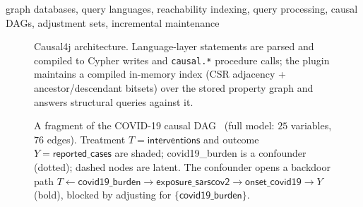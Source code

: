 \documentclass[conference]{IEEEtran}
\begin{document}
\begin{IEEEkeywords}
graph databases, query languages, reachability indexing, query processing,
causal DAGs, adjustment sets, incremental maintenance
\end{IEEEkeywords}

\begin{figure}[t]\centering
  \resizebox{\linewidth}{!}{}
  \caption{Causal4j architecture. Language-layer statements are parsed and
  compiled to Cypher writes and \texttt{causal.*} procedure calls; the plugin
  maintains a compiled in-memory index (CSR adjacency + ancestor/descendant
  bitsets) over the stored property graph and answers structural queries against
  it.}
  \label{fig:arch}
\end{figure}



\begin{figure}[t]\centering
  \resizebox{\linewidth}{!}{}
  \caption{A fragment of the COVID-19 causal DAG~\cite{piccininni2020covid}
  (full model: $25$ variables, $76$ edges). Treatment $T=\textsf{interventions}$
  and outcome $Y=\textsf{reported\_cases}$ are shaded; \textsf{covid19\_burden}
  is a confounder (dotted); dashed nodes are latent. The confounder opens a
  backdoor path $T\!\leftarrow\!\textsf{covid19\_burden}\!\rightarrow\!
  \textsf{exposure\_sarscov2}\!\rightarrow\!\textsf{onset\_covid19}\!\rightarrow\!Y$
  (bold), blocked by adjusting for $\{\textsf{covid19\_burden}\}$.}
  \label{fig:covid}
\end{figure}










\end{document}
